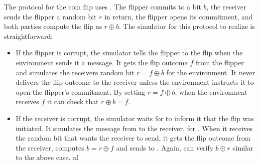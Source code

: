 The protocol for the coin flip uses \Fcom. 
The flipper commits to a bit $b$, the receiver sends the flipper a random bit $r$ in return, the flipper opens its commitment, and both parties compute the flip as $r \oplus b$.
The simulator for this protocol to realize \Fflip is straightforward:
\begin{itemize}
\item If the flipper is corrupt, the simulator tells the flipper to  the flip when the environment sends it a  message. It gets the flip outcome $f$ from the flipper and simulates the receivers random bit $r = f \oplus b$ for the environment. It never delivers the flip outcome to the receiver unless the environment instructs it to open the flipper's commitment. By setting $r = f \oplus b$, when the environment receives $f$ it can check that $r \oplus b = f$.
\item If the receiver is corrupt, the simulator waits for \Fflip to inform it that the flip was initiated. It simulates the  message from \Fcom to the receiver, for \Z. When it receives the random bit that \Z wants the receiver to send, it gets the flip outcome from the receiver, computes $b = r \oplus f$ and sends  to \Z. Again, \Z can verify $b \oplus r$ similar to the above case.
nl
\end{itemize}

